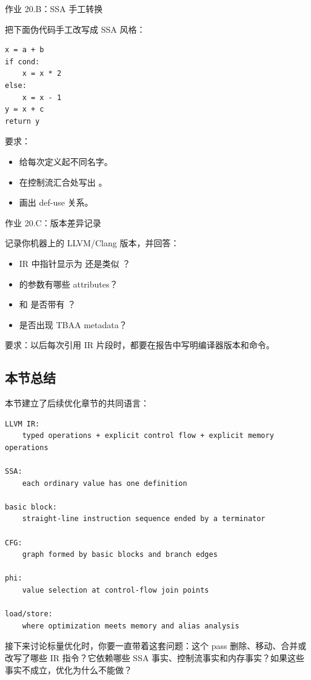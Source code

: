\begin{exercisebox}
作业 20.B：SSA 手工转换

把下面伪代码手工改写成 SSA 风格：

\begin{lstlisting}
x = a + b
if cond:
    x = x * 2
else:
    x = x - 1
y = x + c
return y
\end{lstlisting}

要求：

\begin{itemize}
  \item 给每次定义起不同名字。
  \item 在控制流汇合处写出 。
  \item 画出 def-use 关系。
\end{itemize}
\end{exercisebox}

\begin{exercisebox}
作业 20.C：版本差异记录

记录你机器上的 LLVM/Clang 版本，并回答：

\begin{itemize}
  \item IR 中指针显示为  还是类似 ？
  \item {} 的参数有哪些 attributes？
  \item {} 和  是否带有 ？
  \item 是否出现 TBAA metadata？
\end{itemize}

要求：以后每次引用 IR 片段时，都要在报告中写明编译器版本和命令。
\end{exercisebox}

\subsection{本节总结}

本节建立了后续优化章节的共同语言：

\begin{lstlisting}
LLVM IR:
    typed operations + explicit control flow + explicit memory operations

SSA:
    each ordinary value has one definition

basic block:
    straight-line instruction sequence ended by a terminator

CFG:
    graph formed by basic blocks and branch edges

phi:
    value selection at control-flow join points

load/store:
    where optimization meets memory and alias analysis
\end{lstlisting}

接下来讨论标量优化时，你要一直带着这套问题：这个 pass 删除、移动、合并或改写了哪些 IR 指令？它依赖哪些 SSA 事实、控制流事实和内存事实？如果这些事实不成立，优化为什么不能做？
